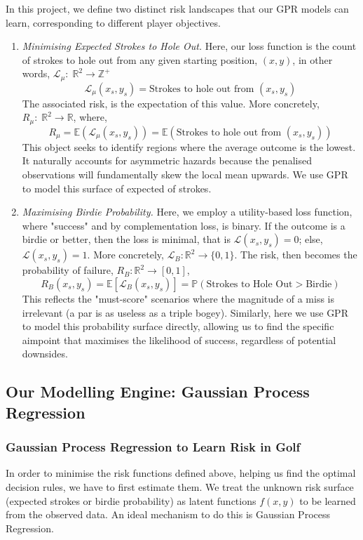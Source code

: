 \documentclass[11pt, letterpaper]{article}
\begin{document}
In this project, we define two distinct risk landscapes that our GPR models can learn, corresponding to different player objectives.
\begin{enumerate}
    \item \textit{Minimising Expected Strokes to Hole Out.} Here, our loss function is the count of strokes to hole out from any given starting position, $(x,y)$, in other words, $\mathcal{L}_{\mu}:\; \mathbb{R}^2 \to \mathbb{Z^+}$
    $$\mathcal{L}_\mu(x_s, y_s) = \text{Strokes to hole out from }(x_s,y_s)$$
    The associated risk, is the expectation of this value. More concretely, $R_{\mu}:\; \mathbb{R}^2 \to \mathbb{R}$, where,
     $$R_{\mu} = \mathbb{E}(\mathcal{L}_\mu(x_s, y_s)) = \mathbb{E}(\text{Strokes to hole out from }(x_s,y_s))$$
    This object seeks to identify regions where the average outcome is the lowest. It naturally accounts for asymmetric hazards because the penalised observations will fundamentally skew the local mean upwards. We use GPR to model this surface of expected of strokes.

    \item \textit{Maximising Birdie Probability.} Here, we employ a utility-based loss function, where "success" and by complementation loss, is binary. If the outcome is a birdie or better, then the loss is minimal, that is $\mathcal{L}(x_s, y_s) = 0$; else, $\mathcal{L}(x_s, y_s) = 1$. More concretely, $\mathcal{L}_B: \mathbb{R}^2 \to \{0,1\}$. The risk, then becomes the probability of failure, $R_B: \mathbb{R}^2 \to [0,1] $,
    $$R_B(x_s, y_s) = \mathbb{E}[\mathcal{L}_B(x_s, y_s)] = \mathbb{{P}}(\text{Strokes to Hole Out} > \text{Birdie}) $$
    This reflects the "must-score" scenarios where the magnitude of a miss is irrelevant (a par is as useless as a triple bogey). Similarly, here we use GPR to model this probability surface directly, allowing us to find the specific aimpoint that maximises the likelihood of success, regardless of potential downsides.
\end{enumerate}

\subsection{Our Modelling Engine: Gaussian Process Regression}

\subsubsection{Gaussian Process Regression to Learn Risk in Golf}
In order to minimise the risk functions defined above, helping us find the optimal decision rules, we have to first estimate them. We treat the unknown risk surface (expected strokes or birdie probability) as latent functions $f(x,y)$ to be learned from the observed data. An ideal mechanism to do this is Gaussian Process Regression.
\end{document}
